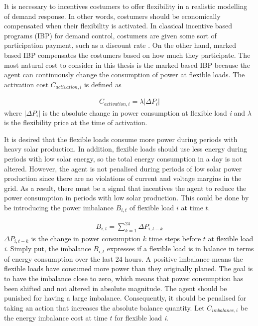 \documentclass[class=book, crop=false]{standalone}
\begin{document}
It is necessary to incentives costumers to offer flexibility in a realistic modelling of demand response. In other words, costumers should be economically compensated when their flexibility is activated. In classical incentive based programs (IBP) for demand control, costumers are given some sort of participation payment, such as a discount rate \cite{demand_response_definition}. On the other hand, marked based IBP compensates the costumers based on how much they participate. The most natural cost to consider in this thesis is the marked based IBP because the agent can continuously change the consumption of power at flexible loads. The activation cost $C_{activation,i}$ is defined as

\begin{equation}
   \begin{aligned}
   \label{eq:problem:activation_cost}
    C_{activation,i} = \lambda |\Delta P_{i}|
    \end{aligned} 
\end{equation}
where $|\Delta P_{i}|$  is the absolute change in power consumption at flexible load \textit{i} and $\lambda$ is the flexibility price at the time of activation.

It is desired that the flexible loads consume more power during periods with heavy solar production. In addition, flexible loads should use less energy during periods with low solar energy, so the total energy consumption in a day is not altered. However, the agent is not penalised during periods of low solar power production since there are no violations of current and voltage margins in the grid. As a result, there must be a signal that incentives the agent to reduce the power consumption in periods with low solar production. This could be done by be introducing the power imbalance $B_{i,t}$ of flexible load $i$ at time $t$.

\begin{equation}
   \begin{aligned}
   \label{eq:problem:balance}
    B_{i,t} = \sum_{k=1}^{24}\Delta P_{i,t-k}
    \end{aligned} 
\end{equation}
$\Delta P_{i,t-k}$ is the change in power consumption $k$ time steps before $t$ at flexible load \textit{i}. Simply put, the imbalance $B_{i,t}$ expresses if a flexible load is in balance in terms of energy consumption over the last 24 hours. A positive imbalance means the flexible loads have consumed more power than they originally planed. The goal is to have the imbalance close to zero, which means that power consumption has been shifted and not altered in absolute magnitude. The agent should be punished for having a large imbalance. Consequently, it should be penalised for taking an action that increases the absolute balance quantity. Let $C_{imbalance,i}$ be the energy imbalance cost at time $t$ for flexible load \textit{i}.
\end{document}

